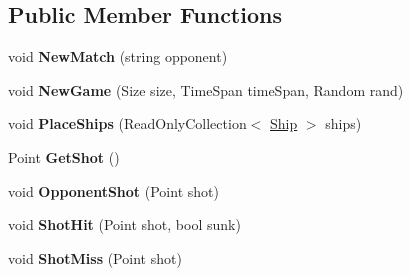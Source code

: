 \subsection*{Public Member Functions}
\begin{DoxyCompactItemize}
\item 
\hypertarget{interface_m_b_c_1_1_core_1_1_i_battleship_controller_a44c7a001b2005e411ccb894223efa3d9}{void {\bfseries New\-Match} (string opponent)}\label{interface_m_b_c_1_1_core_1_1_i_battleship_controller_a44c7a001b2005e411ccb894223efa3d9}

\item 
\hypertarget{interface_m_b_c_1_1_core_1_1_i_battleship_controller_a17dafb26838363ab7630278962523828}{void {\bfseries New\-Game} (Size size, Time\-Span time\-Span, Random rand)}\label{interface_m_b_c_1_1_core_1_1_i_battleship_controller_a17dafb26838363ab7630278962523828}

\item 
\hypertarget{interface_m_b_c_1_1_core_1_1_i_battleship_controller_aacd76e5a0143ed65b3cd4f911b658866}{void {\bfseries Place\-Ships} (Read\-Only\-Collection$<$ \hyperlink{class_m_b_c_1_1_core_1_1_ship}{Ship} $>$ ships)}\label{interface_m_b_c_1_1_core_1_1_i_battleship_controller_aacd76e5a0143ed65b3cd4f911b658866}

\item 
\hypertarget{interface_m_b_c_1_1_core_1_1_i_battleship_controller_a1e3990b3561cdc6980332b60359d797a}{Point {\bfseries Get\-Shot} ()}\label{interface_m_b_c_1_1_core_1_1_i_battleship_controller_a1e3990b3561cdc6980332b60359d797a}

\item 
\hypertarget{interface_m_b_c_1_1_core_1_1_i_battleship_controller_ae8805f1f06e67901db8be2665076582f}{void {\bfseries Opponent\-Shot} (Point shot)}\label{interface_m_b_c_1_1_core_1_1_i_battleship_controller_ae8805f1f06e67901db8be2665076582f}

\item 
\hypertarget{interface_m_b_c_1_1_core_1_1_i_battleship_controller_a4082a60bb8f9873c9ac794953da6563b}{void {\bfseries Shot\-Hit} (Point shot, bool sunk)}\label{interface_m_b_c_1_1_core_1_1_i_battleship_controller_a4082a60bb8f9873c9ac794953da6563b}

\item 
\hypertarget{interface_m_b_c_1_1_core_1_1_i_battleship_controller_ac0806bdf4ceb486920d78c19a088b507}{void {\bfseries Shot\-Miss} (Point shot)}\label{interface_m_b_c_1_1_core_1_1_i_battleship_controller_ac0806bdf4ceb486920d78c19a088b507}


\end{DoxyCompactItemize}
